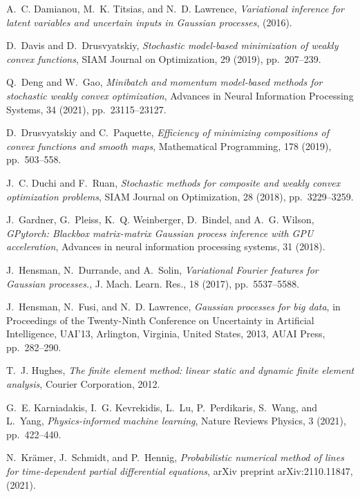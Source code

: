 \documentclass[10pt,reqno]{amsart}
\newcommand{\1}{{\chi}}
\numberwithin{equation}{section}
\theoremstyle{thmlemcorr}
\numberwithin{theorem}{section}
\theoremstyle{thmlemcorr*}
\theoremstyle{defi}
\theoremstyle{remexample}
\theoremstyle{ass}
\begin{document}
\begin{thebibliography}{10}
	{\sc A.~C. Damianou, M.~K. Titsias, and N.~D. Lawrence}, {\em Variational
		inference for latent variables and uncertain inputs in {G}aussian processes},
	(2016).
	
	{\sc D.~Davis and D.~Drusvyatskiy}, {\em Stochastic model-based minimization of
		weakly convex functions}, SIAM Journal on Optimization, 29 (2019),
	pp.~207--239.
	
	{\sc Q.~Deng and W.~Gao}, {\em Minibatch and momentum model-based methods for
		stochastic weakly convex optimization}, Advances in Neural Information
	Processing Systems, 34 (2021), pp.~23115--23127.
	
	{\sc D.~Drusvyatskiy and C.~Paquette}, {\em Efficiency of minimizing
		compositions of convex functions and smooth maps}, Mathematical Programming,
	178 (2019), pp.~503--558.
	
	{\sc J.~C. Duchi and F.~Ruan}, {\em Stochastic methods for composite and weakly
		convex optimization problems}, SIAM Journal on Optimization, 28 (2018),
	pp.~3229--3259.
	
	{\sc J.~Gardner, G.~Pleiss, K.~Q. Weinberger, D.~Bindel, and A.~G. Wilson},
	{\em G{P}ytorch: Blackbox matrix-matrix {G}aussian process inference with
		{GPU} acceleration}, Advances in neural information processing systems, 31
	(2018).
	
	{\sc J.~Hensman, N.~Durrande, and A.~Solin}, {\em Variational {F}ourier
		features for {G}aussian processes.}, J. Mach. Learn. Res., 18 (2017),
	pp.~5537--5588.
	
	{\sc J.~Hensman, N.~Fusi, and N.~D. Lawrence}, {\em {G}aussian processes for
		big data}, in Proceedings of the Twenty-Ninth Conference on Uncertainty in
	Artificial Intelligence, UAI'13, Arlington, Virginia, United States, 2013,
	AUAI Press, pp.~282--290.
	
	{\sc T.~J. Hughes}, {\em The finite element method: linear static and dynamic
		finite element analysis}, Courier Corporation, 2012.
	
	{\sc G.~E. Karniadakis, I.~G. Kevrekidis, L.~Lu, P.~Perdikaris, S.~Wang, and
		L.~Yang}, {\em Physics-informed machine learning}, Nature Reviews Physics, 3
	(2021), pp.~422--440.
	
	{\sc N.~Kr{\"a}mer, J.~Schmidt, and P.~Hennig}, {\em Probabilistic numerical
		method of lines for time-dependent partial differential equations}, arXiv
	preprint arXiv:2110.11847,  (2021).
	

\end{thebibliography}
\end{document}
